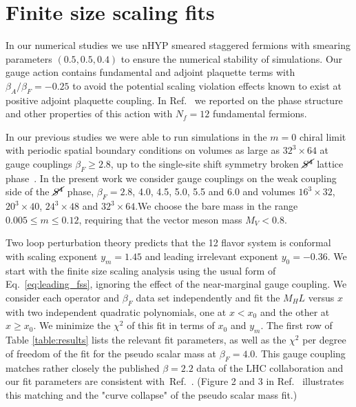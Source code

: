 \documentclass[aps,prl,twocolumn,]{revtex4}  %
\newcommand{\X}{\ensuremath{\!\times\!} }
\newcommand{\Sb}{\ensuremath{\cancel{S^4}} }
\newcommand{\refcite}[1]{Ref.~\cite{#1}}
\newcommand{\eq}[1]{Eq.~\ref{#1}}
\begin{document}




\section{Finite size scaling fits}
In our numerical studies we use nHYP smeared staggered fermions with smearing parameters $(0.5,0.5,0.4)$ to ensure the numerical stability of simulations.
Our gauge action contains fundamental and adjoint plaquette terms with $\beta_A/\beta_F=-0.25$ to avoid the potential scaling violation effects known to exist at positive adjoint plaquette coupling.
In \refcite{Cheng:2011ic} we reported on the phase structure and other properties of this action with $N_f=12$ fundamental fermions.

In our previous studies we were able to run simulations in the $m=0$ chiral limit with periodic spatial boundary conditions on volumes as large as $32^3\X64$ at gauge couplings $\beta_F\ge2.8$, up to the single-site shift symmetry broken  \Sb lattice phase~\cite{Hasenfratz:2013uha}.
In the present work we consider gauge couplings on the weak coupling side of the \Sb phase,  $\beta_F=2.8$, 4.0, 4.5, 5.0, 5.5 and 6.0 and volumes $16^3\X32$, $20^3\X40$, $24^3\X48$ and $32^3\X64$.We choose the bare mass in the range $0.005 \leq m \leq 0.12$, requiring that the vector meson mass $M_V < 0.8$.



Two loop perturbation theory predicts that the 12 flavor system is conformal with scaling exponent $y_m=1.45$ and leading irrelevant exponent $y_0=-0.36$. We start with the  finite size scaling analysis  using the usual form of \eq{eq:leading_fss}, ignoring the effect of the near-marginal gauge coupling. We consider each operator and $\beta_F$ data set independently and fit the $M_H L$ versus $x$ with two independent quadratic polynomials, one at $x<x_0$ and the other at $x\ge x_0$. We minimize the $\chi^2$ of this fit in terms of $x_0$ and $y_m$.
The first row of  Table \ref{table:results} lists the relevant fit parameters, as well as the $\chi^2$ per degree of freedom of the fit for the pseudo scalar mass  at $\beta_F=4.0$. This gauge coupling matches rather closely the published $\beta=2.2$ data of the LHC collaboration and our fit parameters are consistent with~\refcite{Fodor:2011tu}. (Figure 2 and 3  in \refcite{Hasenfratz:2013eka} illustrates this matching and  the "curve collapse" of the pseudo scalar mass  fit.) 
\end{document}
